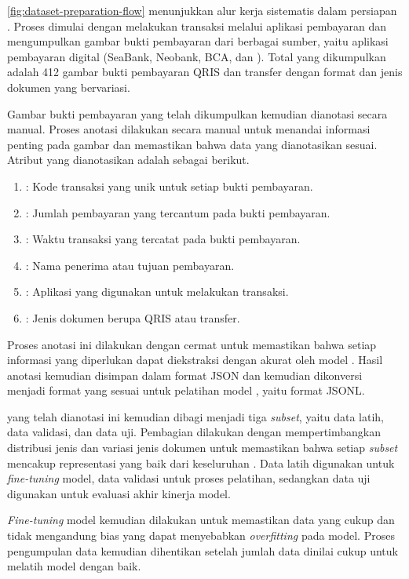 \autoref{fig:dataset-preparation-flow} menunjukkan alur kerja sistematis dalam persiapan \dataset. Proses dimulai dengan melakukan transaksi melalui aplikasi pembayaran dan mengumpulkan gambar bukti pembayaran dari berbagai sumber, yaitu aplikasi pembayaran digital (SeaBank, Neobank, BCA, dan \gopay). Total \dataset{} yang dikumpulkan adalah 412 gambar bukti pembayaran QRIS dan transfer dengan format dan jenis dokumen yang bervariasi.

Gambar bukti pembayaran yang telah dikumpulkan kemudian dianotasi secara manual. Proses anotasi dilakukan secara manual untuk menandai informasi penting pada gambar dan memastikan bahwa data yang dianotasikan sesuai. Atribut yang dianotasikan adalah sebagai berikut.
\begin{enumerate}
    \item \iden{}: Kode transaksi yang unik untuk setiap bukti pembayaran.
    \item \total{}: Jumlah pembayaran yang tercantum pada bukti pembayaran.
    \item \ttime{}: Waktu transaksi yang tercatat pada bukti pembayaran.
    \item \target{}: Nama penerima atau tujuan pembayaran.
    \item \app{}: Aplikasi yang digunakan untuk melakukan transaksi.
    \item \type{}: Jenis dokumen berupa QRIS atau transfer.
\end{enumerate}

Proses anotasi ini dilakukan dengan cermat untuk memastikan bahwa setiap informasi yang diperlukan dapat diekstraksi dengan akurat oleh model \donut{}. Hasil anotasi kemudian disimpan dalam format JSON dan kemudian dikonversi menjadi format yang sesuai untuk pelatihan model \donut{}, yaitu format JSONL. 

\datasetfl{} yang telah dianotasi ini kemudian dibagi menjadi tiga \emph{subset}, yaitu data latih, data validasi, dan data uji. Pembagian dilakukan dengan mempertimbangkan distribusi jenis dan variasi jenis dokumen untuk memastikan bahwa setiap \emph{subset} mencakup representasi yang baik dari keseluruhan \dataset. Data latih digunakan untuk \emph{fine-tuning} model, data validasi untuk proses pelatihan, sedangkan data uji digunakan untuk evaluasi akhir kinerja model. 

\emph{Fine-tuning} model kemudian dilakukan untuk memastikan data yang cukup dan tidak mengandung bias yang dapat menyebabkan \emph{overfitting} pada model. Proses pengumpulan data kemudian dihentikan setelah jumlah data dinilai cukup untuk melatih model \donut{} dengan baik.
